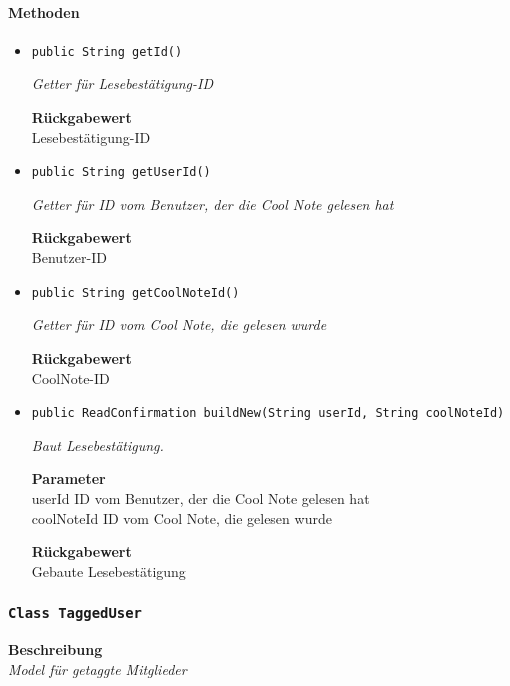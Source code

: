     \paragraph*{Methoden}
    \begin{itemize}
    	\item{\texttt{public String getId()}}
    	
    	\textit{Getter für Lesebestätigung-ID}
    	
    	
    	
    	\textbf{Rückgabewert} \\
    	Lesebestätigung-ID        \item{\texttt{public String getUserId()}}
    	
    	\textit{Getter für ID vom Benutzer, der die Cool Note gelesen hat}
    	
    	
    	
    	\textbf{Rückgabewert} \\
    	Benutzer-ID        \item{\texttt{public String getCoolNoteId()}}
    	
    	\textit{Getter für ID vom Cool Note, die gelesen wurde}
    	
    	
    	
    	\textbf{Rückgabewert} \\
    	CoolNote-ID        \item{\texttt{public ReadConfirmation buildNew(String userId, String coolNoteId)}}
    	
    	\textit{Baut Lesebestätigung.}
    	
    	\textbf{Parameter} \\
    	userId ID vom Benutzer, der die Cool Note gelesen hat\\
    	coolNoteId ID vom Cool Note, die gelesen wurde
    	
    	\textbf{Rückgabewert} \\
    	Gebaute Lesebestätigung
    \end{itemize}
    \subsubsection{\texttt{Class TaggedUser}}
    \textbf{Beschreibung} \\
    \textit{Model für getaggte Mitglieder}
